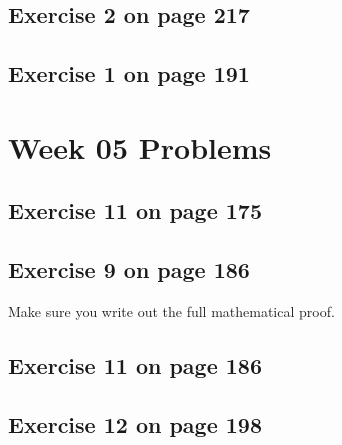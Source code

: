 \documentclass[12pt]{amsart}
\begin{document}
\subsection{Exercise 2 on page 217}
\subsection{ Exercise 1 on page 191} 


\section{Week 05 Problems}
\subsection{Exercise 11 on page 175} 
\subsection{Exercise 9 on page 186} Make sure you write out the full mathematical proof.
\subsection{Exercise 11 on page 186}
\subsection{Exercise 12 on page 198}
\end{document}
